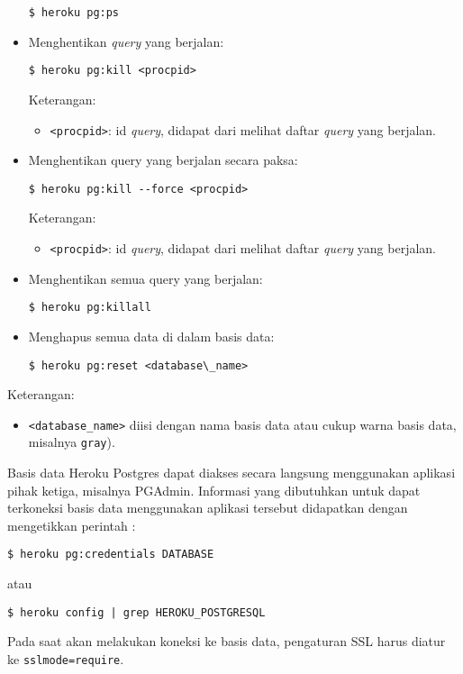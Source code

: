 \begin{itemize}
\begin{lstlisting}
$ heroku pg:ps
\end{lstlisting}

\item Menghentikan \textit{query} yang berjalan:

\begin{lstlisting}
$ heroku pg:kill <procpid>
\end{lstlisting}
Keterangan:
\begin{itemize}
\item \texttt{<procpid>}: id \textit{query}, didapat dari melihat daftar \textit{query} yang berjalan.
\end{itemize}

\item Menghentikan query yang berjalan secara paksa:

\begin{lstlisting}
$ heroku pg:kill --force <procpid>
\end{lstlisting}
Keterangan:
\begin{itemize}
\item \texttt{<procpid>}: id \textit{query}, didapat dari melihat daftar \textit{query} yang berjalan.
\end{itemize}

\item Menghentikan semua query yang berjalan:

\begin{lstlisting}
$ heroku pg:killall
\end{lstlisting}

\item Menghapus semua data di dalam basis data:

\begin{lstlisting}
$ heroku pg:reset <database\_name>
\end{lstlisting}
\end{itemize}
Keterangan:
\begin{itemize}
\item \texttt{<database\_name>} diisi dengan nama basis data atau cukup warna basis data, misalnya \texttt{gray}).
\end{itemize}

Basis data Heroku Postgres dapat diakses secara langsung menggunakan aplikasi pihak ketiga, misalnya PGAdmin. Informasi yang dibutuhkan untuk dapat terkoneksi basis data menggunakan aplikasi tersebut didapatkan dengan mengetikkan perintah :
\begin{lstlisting}
$ heroku pg:credentials DATABASE	
\end{lstlisting}
atau
\begin{lstlisting}
$ heroku config | grep HEROKU_POSTGRESQL	
\end{lstlisting}
Pada saat akan melakukan koneksi ke basis data, pengaturan SSL harus diatur ke \texttt{sslmode=require}.

